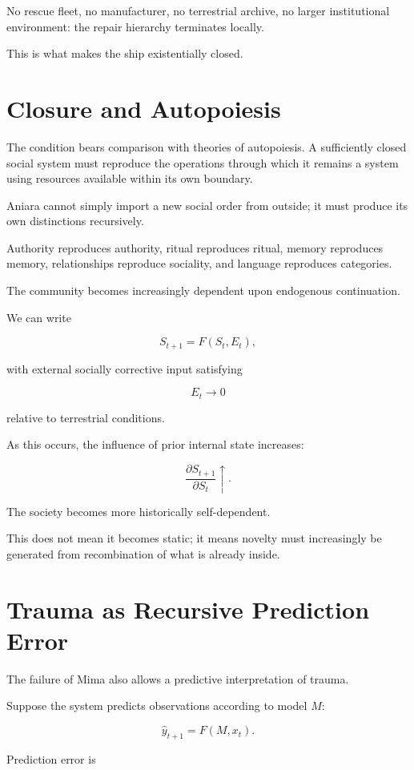 \documentclass[11pt,oneside]{book}
\theoremstyle{definition}
\theoremstyle{remark}
\begin{document}
No rescue fleet, no manufacturer, no terrestrial archive, no larger institutional environment: the repair hierarchy terminates locally.

This is what makes the ship existentially closed.

\section{Closure and Autopoiesis}

The condition bears comparison with theories of autopoiesis. A sufficiently closed social system must reproduce the operations through which it remains a system using resources available within its own boundary.

Aniara cannot simply import a new social order from outside; it must produce its own distinctions recursively.

Authority reproduces authority, ritual reproduces ritual, memory reproduces memory, relationships reproduce sociality, and language reproduces categories.

The community becomes increasingly dependent upon endogenous continuation.

We can write

\[
S_{t+1}
=
F(S_t,E_t),
\]

with external socially corrective input satisfying

\[
E_t\rightarrow0
\]

relative to terrestrial conditions.

As this occurs, the influence of prior internal state increases:

\[
\frac{\partial S_{t+1}}
{\partial S_t}
\uparrow.
\]

The society becomes more historically self-dependent.

This does not mean it becomes static; it means novelty must increasingly be generated from recombination of what is already inside.

\section{Trauma as Recursive Prediction Error}

The failure of Mima also allows a predictive interpretation of trauma.

Suppose the system predicts observations according to model \(M\):

\[
\hat y_{t+1}
=
F(M,x_t).
\]

Prediction error is
\end{document}
